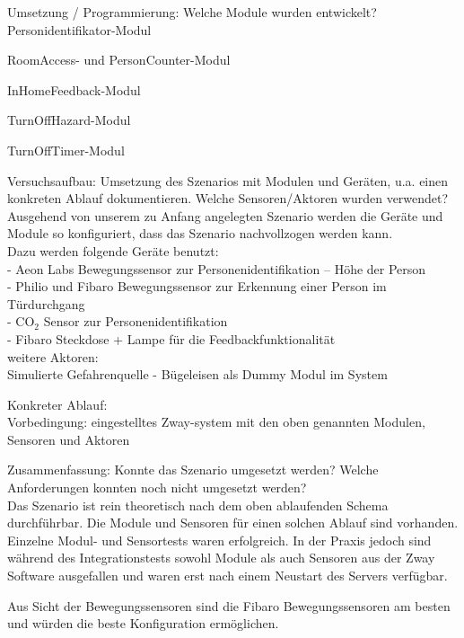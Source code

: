 Umsetzung / Programmierung: Welche Module wurden entwickelt?\\

Personidentifikator-Modul

RoomAccess- und PersonCounter-Modul

InHomeFeedback-Modul



TurnOffHazard-Modul



TurnOffTimer-Modul



Versuchsaufbau: Umsetzung des Szenarios mit Modulen und Geräten, u.a. einen konkreten Ablauf dokumentieren. Welche Sensoren/Aktoren wurden verwendet?\\

Ausgehend von unserem zu Anfang angelegten Szenario werden die Geräte und Module so konfiguriert, dass das Szenario nachvollzogen werden kann.\\
Dazu werden folgende Geräte benutzt:\\
- Aeon Labs Bewegungssensor zur Personenidentifikation – Höhe der Person\\
- Philio und Fibaro Bewegungssensor zur Erkennung einer Person im Türdurchgang\\
- CO$_2$ Sensor zur Personenidentifikation\\
- Fibaro Steckdose + Lampe für die Feedbackfunktionalität\\

weitere Aktoren:\\
Simulierte Gefahrenquelle - Bügeleisen als Dummy Modul im System

Konkreter Ablauf:\\

Vorbedingung: eingestelltes Zway-system mit den oben genannten Modulen, Sensoren und Aktoren


Zusammenfassung: Konnte das Szenario umgesetzt werden? Welche Anforderungen konnten noch nicht umgesetzt werden?\\

Das Szenario ist rein theoretisch nach dem oben ablaufenden Schema durchführbar. Die Module und Sensoren für einen solchen Ablauf sind vorhanden. Einzelne Modul- und Sensortests waren erfolgreich.
In der Praxis jedoch sind während des Integrationstests sowohl Module als auch Sensoren aus der Zway Software ausgefallen und waren erst nach einem Neustart des Servers verfügbar.

Aus Sicht der Bewegungssensoren sind die Fibaro Bewegungssensoren am besten und würden die beste Konfiguration ermöglichen.


